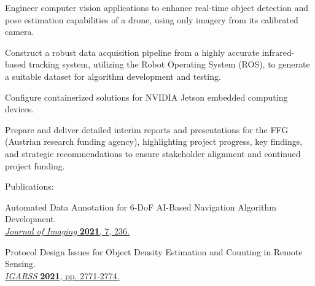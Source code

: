\begin{tightemize}
    \item Engineer computer vision applications to enhance real-time object detection and pose estimation capabilities of a drone, using only imagery from its calibrated camera.
    \item Construct a robust data acquisition pipeline from a highly accurate infrared-based tracking system, utilizing the Robot Operating System (ROS), to generate a suitable dataset for algorithm development and testing.
    \item Configure containerized solutions for NVIDIA Jetson embedded computing devices.
    \item Prepare and deliver detailed interim reports and presentations for the FFG (Austrian research funding agency), highlighting project progress, key findings, and strategic recommendations to ensure stakeholder alignment and continued project funding.
\end{tightemize}
\medsep
\textsf{Publications:}
\begin{tightemize}
    \item Automated Data Annotation for 6-DoF AI-Based Navigation Algorithm Development. \\\href{https://doi.org/10.3390/jimaging7110236}{\textit{Journal of Imaging} \textbf{2021}, 7, 236.}
    \item Protocol Design Issues for Object Density Estimation and Counting in Remote Sensing. \\\href{https://doi.org/10.1109/IGARSS47720.2021.9553934}{\textit{IGARSS} \textbf{2021}, pp. 2771-2774.}
\end{tightemize}